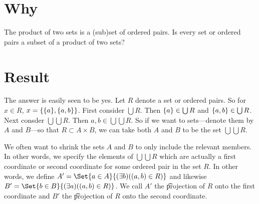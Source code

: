 

\section*{Why}

The product of two sets is a (sub)set of ordered pairs.
Is every set or ordered pairs a subset of a product of two sets?

\section*{Result}

The answer is easily seen to be yes.
Let $R$ denote a set or ordered pairs.
So for $x \in R$, $x = \{\{a\}, \{a, b\}\}$.
First consider $\bigcup R$.
Then $\{a\} \in \bigcup R$ and $\{a, b\} \in \bigcup R$.
Next consder $\bigcup\bigcup R$.
Then $a, b \in \bigcup\bigcup R$.
So if we want to sets---denote them by $A$ and $B$---so that $R \subset A \times B$, we can take both $A$ and $B$ to be the set $\bigcup\bigcup R$.

We often want to shrink the sets $A$ and $B$ to only include the relevant members.
In other words, we specify the elements of $\bigcup\bigcup R$ which are actually a first coordinate or second coordinate for some ordered pair in the set $R$.
In other words, we define $A' = \Set{a \in A}{(\exists b)((a, b) \in R)}$ and likewise $B' = \Set{b \in B}{(\exists a)((a, b) \in R)}$.
We call $A'$ the \t{projection of $R$ onto the first coordinate} and $B'$ the \t{projection of $R$ onto the second coordinate.}

\blankpage